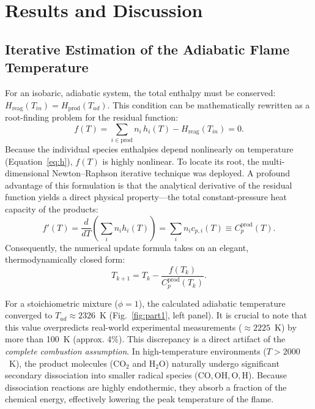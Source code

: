 \documentclass[11pt,a4paper]{article}
\begin{document}
\section{Results and Discussion}

\subsection{Iterative Estimation of the Adiabatic Flame Temperature}
\label{sec:tad}
For an isobaric, adiabatic system, the total enthalpy must be conserved: $H_{\text{reag}}(T_{in}) = H_{\text{prod}}(T_{ad})$.
This condition can be mathematically rewritten as a root-finding problem for the residual function:
\begin{equation}
  f(T) = \sum_{i\in\text{prod}} n_i\, h_i(T) - H_{\text{reag}}(T_{in}) = 0.
  \label{eq:resid}
\end{equation}
Because the individual species enthalpies depend nonlinearly on temperature (Equation~\ref{eq:h}), $f(T)$ is highly nonlinear.
To locate its root, the multi-dimensional Newton--Raphson iterative technique was deployed. A profound advantage of this formulation is that the analytical derivative of the residual function yields a direct physical property—the total constant-pressure heat capacity of the products:
\begin{equation}
  f'(T) = \frac{d}{dT} \left( \sum_i n_i h_i(T) \right) = \sum_i n_i c_{p,i}(T) \equiv C_p^{\text{prod}}(T).
\end{equation}
Consequently, the numerical update formula takes on an elegant, thermodynamically closed form:
\begin{equation}
  T_{k+1} = T_k - \frac{f(T_k)}{C_p^{\text{prod}}(T_k)}.
  \label{eq:newton}
\end{equation}

For a stoichiometric mixture ($\phi=1$), the calculated adiabatic temperature converged to $T_{ad}\approx 2326$~K (Fig.~\ref{fig:part1}, left panel). It is crucial to note that this value overpredicts real-world experimental measurements ($\approx 2225$~K) by more than 100~K (approx. 4\%). This discrepancy is a direct artifact of the \emph{complete combustion assumption}. In high-temperature environments ($T > 2000$~K), the product molecules ($\mathrm{CO_2}$ and $\mathrm{H_2O}$) naturally undergo significant secondary dissociation into smaller radical species ($\mathrm{CO, OH, O, H}$). Because dissociation reactions are highly endothermic, they absorb a fraction of the chemical energy, effectively lowering the peak temperature of the flame.
\end{document}
